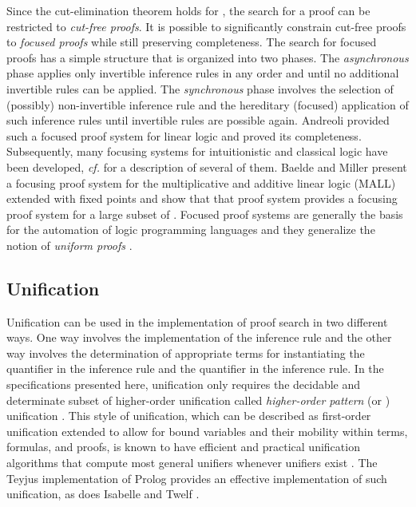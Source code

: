\documentclass{acmtrans2m}
\begin{document}
Since the cut-elimination theorem holds for , the search for
a proof can be restricted to {\em cut-free proofs}.  It is possible to
significantly constrain cut-free proofs to {\em focused proofs} while
still preserving completeness.  The search for focused proofs has a
simple structure that is organized into two phases.  The {\em
  asynchronous} phase applies only invertible inference rules in any
order and until no additional invertible rules can be applied.  The
{\em synchronous} phase involves the selection of (possibly)
non-invertible inference rule and the hereditary (focused) application
of such inference rules until invertible rules are possible again.
Andreoli \cite{andreoli92jlc} provided such a focused proof system for
linear logic and proved its completeness.  Subsequently, many 
focusing systems for intuitionistic and classical logic have been
developed, {\em cf.} \cite{liang07csl} for a description of several of
them. 
Baelde and Miller \citeyear{baelde07lpar} present a 
focusing proof system for the multiplicative and additive linear
logic (MALL) extended with fixed points and show that that proof
system provides a focusing proof system for a large
subset of .
Focused proof systems are
generally the basis for the automation of logic programming languages
and they generalize the notion of {\em uniform proofs}
\cite{miller91apal}.  

\subsection{Unification}
Unification can be used in the implementation of  proof
search in two different ways.  
One way involves the implementation of the  inference rule
and the other way involves the determination of appropriate terms for
instantiating the 
 quantifier in the  inference rule and the
 quantifier in the  inference rule.  In the
specifications presented here, unification only requires the decidable
and determinate subset of higher-order unification called {\em
higher-order pattern} (or ) unification \cite{miller91jlc}.
This style of unification, which can be described as first-order
unification extended to allow for bound variables and their mobility
within terms, formulas, and proofs, is known to have efficient and practical
unification algorithms that compute most general unifiers whenever
unifiers exist \cite{nipkow93lics,nadathur05iclp}.  The Teyjus implementation
\cite{nadathur99cade,nadathur05tplp} of Prolog provides an
effective implementation of such unification, as does Isabelle
\cite{paulson90abs} and Twelf \cite{pfenning99cade}.
\end{document}
